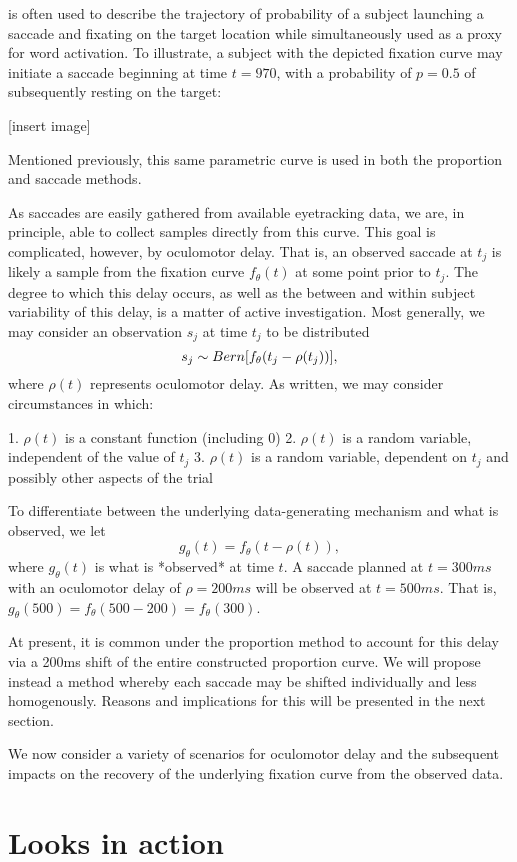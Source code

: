 \documentclass{article}
\begin{document}
is often used to describe the trajectory of probability of a subject launching a saccade and fixating on the target location while simultaneously used as a proxy for word activation. To illustrate, a subject with the depicted fixation curve may initiate a saccade beginning at time $t = 970$, with a probability of $p = 0.5$ of subsequently resting on the target:

[insert image]


Mentioned previously, this same parametric curve is used in both the proportion and saccade methods.

As saccades are easily gathered from available eyetracking data, we are, in principle, able to collect samples directly from this curve. This goal is complicated, however, by oculomotor delay. That is, an observed saccade at $t_j$ is likely a sample from the fixation curve $f_{\theta}(t)$ at some point prior to $t_j$. The degree to which this delay occurs, as well as the between and within subject variability of this delay, is a matter of active investigation. Most generally, we may consider an observation $s_j$ at time $t_j$ to be distributed
$$
s_j \sim  Bern \large[f_{\theta}(t_j - \rho(t_j)) \large],
$$ 
where $\rho(t)$ represents oculomotor delay. As written, we may consider circumstances in which:

1.  $\rho(t)$ is a constant function (including 0)
2.  $\rho(t)$ is a random variable, independent of the value of $t_j$
3.  $\rho(t)$ is a random variable, dependent on $t_j$ and possibly other aspects of the trial

To differentiate between the underlying data-generating mechanism and what is observed, we let
$$
g_{\theta}(t) = f_{\theta}(t - \rho(t)), 
$$
where $g_{\theta}(t)$ is what is *observed* at time $t$. A saccade planned at $t = 300ms$ with an oculomotor delay of $\rho = 200ms$ will be observed at $t = 500ms$. That is, $g_{\theta}(500) = f_{\theta}(500 - 200) = f_{\theta}(300)$.

At present, it is common under the proportion method to account for this delay via a 200ms shift of the entire constructed proportion curve. We will propose instead a method whereby each saccade may be shifted individually and less homogenously. Reasons and implications for this will be presented in the next section.

We now consider a variety of scenarios for oculomotor delay and the subsequent impacts on the recovery of the underlying fixation curve from the observed data.

\section{Looks in action}
\end{document}
